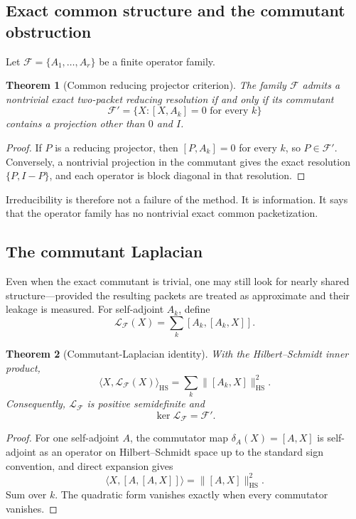 \documentclass[11pt]{article}
\newtheorem{theorem}{Theorem}[section]
\theoremstyle{definition}
\theoremstyle{remark}
\begin{document}
\subsection{Exact common structure and the commutant obstruction}

Let \(\mathcal F=\{A_1,\ldots,A_r\}\) be a finite operator family.

\begin{theorem}[Common reducing projector criterion]
The family \(\mathcal F\) admits a nontrivial exact two-packet reducing resolution if and only if its commutant
\[
\mathcal F'
=
\{X:[X,A_k]=0\text{ for every }k\}
\]
contains a projection other than \(0\) and \(I\).
\end{theorem}

\begin{proof}
If \(P\) is a reducing projector, then \([P,A_k]=0\) for every \(k\), so \(P\in\mathcal F'\).  Conversely, a nontrivial projection in the commutant gives the exact resolution \(\{P,I-P\}\), and each operator is block diagonal in that resolution.
\end{proof}

Irreducibility is therefore not a failure of the method.  It is information.  It says that the operator family has no nontrivial exact common packetization.

\subsection{The commutant Laplacian}

Even when the exact commutant is trivial, one may still look for nearly shared structure---provided the resulting packets are treated as approximate and their leakage is measured.  For self-adjoint \(A_k\), define
\[
\mathcal L_\mathcal F(X)
=
\sum_k[A_k,[A_k,X]].
\]

\begin{theorem}[Commutant-Laplacian identity]
With the Hilbert--Schmidt inner product,
\[
\boxed{
\langle X,\mathcal L_\mathcal F(X)\rangle_{\mathrm{HS}}
=
\sum_k\|[A_k,X]\|_{\mathrm{HS}}^2.
}
\]
Consequently, \(\mathcal L_\mathcal F\) is positive semidefinite and
\[
\ker\mathcal L_\mathcal F=\mathcal F'.
\]
\end{theorem}

\begin{proof}
For one self-adjoint \(A\), the commutator map \(\delta_A(X)=[A,X]\) is self-adjoint as an operator on Hilbert--Schmidt space up to the standard sign convention, and direct expansion gives
\[
\langle X,[A,[A,X]]\rangle
=
\|[A,X]\|_{\mathrm{HS}}^2.
\]
Sum over \(k\).  The quadratic form vanishes exactly when every commutator vanishes.
\end{proof}
\end{document}

